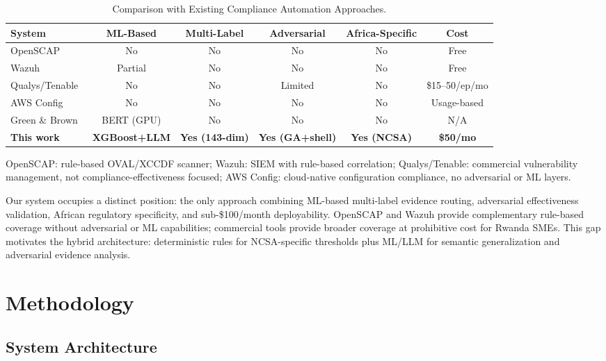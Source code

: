 \documentclass[futureinternet,article,submit,pdftex,moreauthors]{Definitions/mdpi}
\begin{document}
\begin{table}[H]
\caption{Comparison with Existing Compliance Automation Approaches.\label{tab:system_comparison}}
\begin{tabularx}{\textwidth}{lCCCCC}
\toprule
\textbf{System} & \textbf{ML-Based} & \textbf{Multi-Label} & \textbf{Adversarial} & \textbf{Africa-Specific} & \textbf{Cost} \\
\midrule
OpenSCAP~\cite{openscap} & No & No & No & No & Free \\
Wazuh~\cite{wazuh_ref} & Partial & No & No & No & Free \\
Qualys/Tenable & No & No & Limited & No & \$15--50/ep/mo \\
AWS Config & No & No & No & No & Usage-based \\
Green \& Brown~\cite{bert_audit} & BERT (GPU) & No & No & No & N/A \\
\midrule
\textbf{This work} & \textbf{XGBoost+LLM} & \textbf{Yes (143-dim)} & \textbf{Yes (GA+shell)} & \textbf{Yes (NCSA)} & \textbf{\$50/mo} \\
\bottomrule
\end{tabularx}
{\footnotesize OpenSCAP: rule-based OVAL/XCCDF scanner; Wazuh: SIEM with rule-based correlation;
Qualys/Tenable: commercial vulnerability management, not compliance-effectiveness focused;
AWS Config: cloud-native configuration compliance, no adversarial or ML layers.}
\end{table}

Our system occupies a distinct position: the only approach combining ML-based multi-label
evidence routing, adversarial effectiveness validation, African regulatory specificity, and
sub-\$100/month deployability. OpenSCAP and Wazuh provide complementary rule-based coverage
without adversarial or ML capabilities; commercial tools provide broader coverage at
prohibitive cost for Rwanda SMEs. This gap motivates the hybrid architecture: deterministic
rules for NCSA-specific thresholds plus ML/LLM for semantic generalization and adversarial
evidence analysis.

\section{Methodology}
\label{sec:method}

\subsection{System Architecture}
\end{document}
